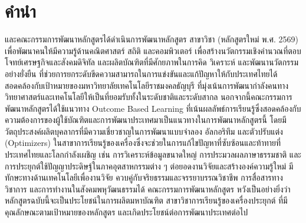 \cleardoublepage
\chapter*{คำนำ}

\faculty{} และคณะกรรมการพัฒนาหลักสูตรได้ดำเนินการพัฒนาหลักสูตร\thdegree{} สาขาวิชา\thdegreebranch{} (หลักสูตรใหม่ พ.ศ. 2569) เพื่อพัฒนาคนให้มีความรู้ด้านคณิตศาสตร์ สถิติ และคอมพิวเตอร์ เพื่อสร้างนวัตกรรมเชิงคำนวณที่ตอบโจทย์เศรษฐกิจและสังคมดิจิทัล และผลิตบัณฑิตที่มีศักยภาพในการคิด วิเคราะห์ และพัฒนานวัตกรรมอย่างยั่งยืน ที่ช่วยการยกระดับขีดความสามารถในการแข่งขันและแก้ปัญหาให้กับประเทศไทยได้สอดคล้องกับเป้าหมายของมหาวิทยาลัยเทคโนโลยีราชมงคลธัญบุรี ที่มุ่งเน้นการพัฒนากำลังคนทางวิทยาศาสตร์และเทคโนโลยีให้เป็นที่ยอมรับทั้งในระดับชาติและระดับสากล นอกจากนี้คณะกรรมการพัฒนาหลักสูตรได้ใช้แนวทาง Outcome Based Learning ที่เน้นผลลัพธ์การเรียนรู้ซึ่งสอดคล้องกับความต้องการของผู้ใช้บัณฑิตและการพัฒนาประเทศมาเป็นแนวทางในการพัฒนาหลักสูตรนี้ โดยมีวัตถุประสงค์ผลิตบุคลากรที่มีความเชี่ยวชาญในการพัฒนาแบบจำลอง อัลกอริทึม และตัวปรับแต่ง (Optimizers) ในสาขาการเรียนรู้ของเครื่องซึ่งจะช่วยในการแก้ไขปัญหาที่ซับซ้อนและท้าทายที่ประเทศไทยและโลกกำลังเผชิญ เช่น การวิเคราะห์ข้อมูลขนาดใหญ่ การประมวลผลภาษาธรรมชาติ และการประยุกต์ใช้ปัญญาประดิษฐ์ในภาคอุตสาหกรรมต่าง ๆ ต่อยอดงานวิจัยและสร้างองค์ความรู้ใหม่ มีทักษะทางด้านเทคโนโลยีเพื่องานวิจัย ควบคู่กับจริยธรรมและจรรยาบรรณวิชาชีพ การสื่อสารทางวิชาการ และการทำงานในสังคมพหุวัฒนธรรมได้ คณะกรรมการพัฒนาหลักสูตร \faculty{} หวังเป็นอย่างยิ่งว่าหลักสูตรฉบับนี้จะเป็นประโยชน์ในการผลิตมหาบัณฑิต สาขาวิชาการเรียนรู้ของเครื่องประยุกต์ ที่มีคุณลักษณะตามเป้าหมายของหลักสูตร และเกิดประโยชน์ต่อการพัฒนาประเทศต่อไป

\vspace{5mm}\par
\begin{flushright}
\faculty\\
\university
\end{flushright}